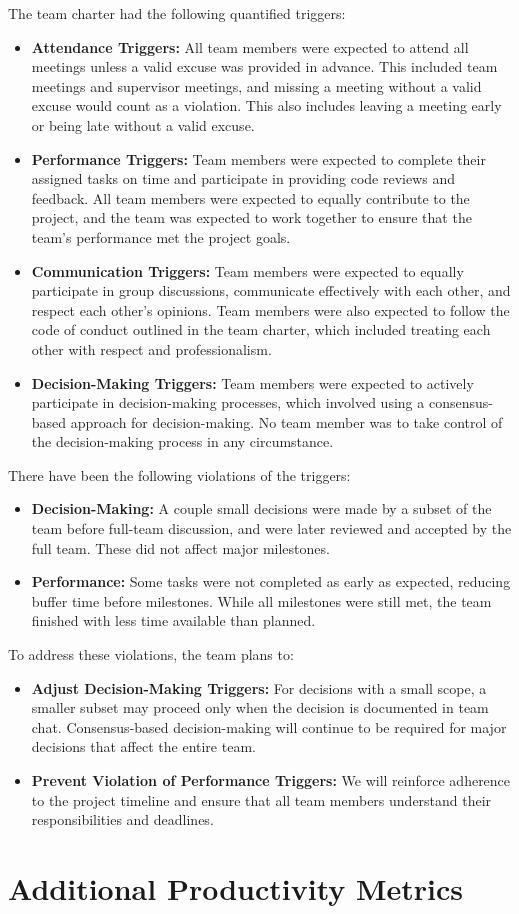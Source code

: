 \documentclass{article}
\begin{document}
The team charter had the following quantified triggers:
\begin{itemize}
	\item \textbf{Attendance Triggers:} All team members were expected to attend all meetings unless a valid excuse was provided in advance. 
	This included team meetings and supervisor meetings, and missing a meeting without a valid excuse would count as a violation. This 
	also includes leaving a meeting early or being late without a valid excuse.
	\item \textbf{Performance Triggers:} Team members were expected to complete their assigned tasks on time and participate in providing code reviews and feedback. 
	All team members were expected to equally contribute to the project, and the team was expected to work together to ensure that the team's performance met the project goals.
	\item \textbf{Communication Triggers:} Team members were expected to equally participate in group discussions, communicate effectively with each other, and respect each other's opinions.
	Team members were also expected to follow the code of conduct outlined in the team charter, which included treating each other with respect and professionalism. 
	\item \textbf{Decision-Making Triggers:} Team members were expected to actively participate in decision-making processes, which involved using a consensus-based approach for decision-making. 
	No team member was to take control of the decision-making process in any circumstance.
\end{itemize} 

There have been the following violations of the triggers:
\begin{itemize}
	\item \textbf{Decision-Making:} A couple small decisions were made by a subset of the team before full-team discussion, and were later reviewed and accepted by the full team. These did not affect major milestones.
	\item \textbf{Performance:} Some tasks were not completed as early as expected, reducing buffer time before milestones. While all milestones were still met, the team finished with less time available than planned.
\end{itemize}

To address these violations, the team plans to:
\begin{itemize}
	\item \textbf{Adjust Decision-Making Triggers:} For decisions with a small scope, a smaller subset may proceed only when the decision is documented in team chat. Consensus-based decision-making will continue to be required for major decisions that affect the entire team.
	\item \textbf{Prevent Violation of Performance Triggers:} We will reinforce adherence to the project timeline and ensure that all team members understand their responsibilities and deadlines.
\end{itemize}

\section{Additional Productivity Metrics}

\end{document}
